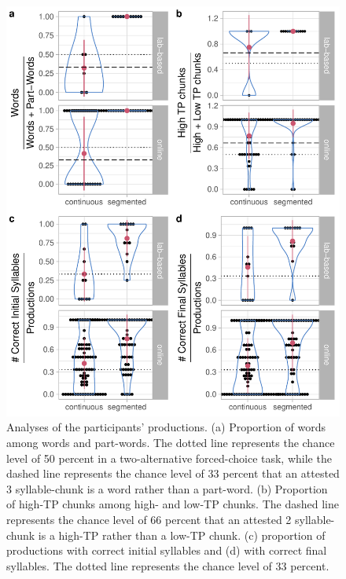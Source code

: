 \documentclass[
]{article}
\begin{document}
\begin{figure}

{\centering \includegraphics[width=0.8\linewidth]{segmentation_recall_combined_for_revision2_files/figure-latex/recall-w-pw-chunks-positions-plot-1} 

}

\caption{Analyses of the participants' productions. (a) Proportion of words among words and part-words. The dotted line represents the chance level of 50 percent in a two-alternative forced-choice task, while the dashed line represents the chance level of 33 percent that an attested 3 syllable-chunk is a word rather than a part-word. (b) Proportion of high-TP chunks among high- and low-TP chunks. The dashed line represents the chance level of 66 percent that an attested 2 syllable-chunk is a high-TP rather than a low-TP chunk. (c) proportion of productions with correct initial syllables and (d) with correct final syllables. The dotted line represents the chance level of 33 percent.}\label{fig:recall-w-pw-chunks-positions-plot}
\end{figure}
\end{document}

